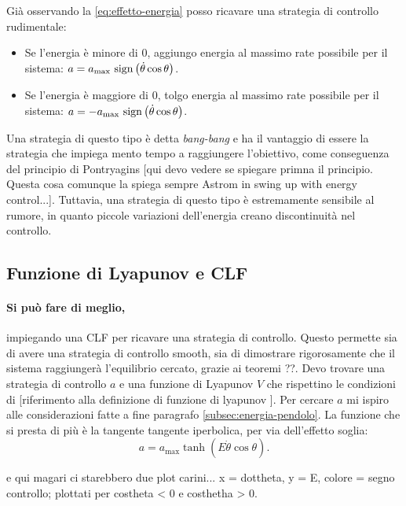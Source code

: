 Già osservando la \eqref{eq:effetto-energia} posso ricavare una strategia di controllo rudimentale:
\begin{itemize}
    \item Se l'energia è minore di $0$, aggiungo energia al massimo rate possibile per il sistema: $a = a_{\max}\ \mathrm{sign}\left(\dot \theta \cos \theta\right)$.
    \item Se l'energia è maggiore di $0$, tolgo energia al massimo rate possibile per il sistema: $a = -a_{\max}\ \mathrm{sign}\left(\dot \theta \cos \theta\right)$.
\end{itemize}
Una strategia di questo tipo è detta \emph{bang-bang} e ha il vantaggio di essere la strategia che impiega mento tempo a raggiungere l'obiettivo, come conseguenza del principio di Pontryagins [qui devo vedere se spiegare primna il principio. Questa cosa comunque la spiega sempre Astrom in swing up with energy control...]. Tuttavia, una strategia di questo tipo è estremamente sensibile al rumore, in quanto piccole variazioni dell'energia creano discontinuità nel controllo.


\subsection{Funzione di Lyapunov e CLF}
\paragraph{Si può fare di meglio,} impiegando una CLF per ricavare una strategia di controllo. Questo permette sia di avere una strategia di controllo smooth, sia di dimostrare rigorosamente che il sistema raggiungerà l'equilibrio cercato, grazie ai teoremi ??. 
Devo trovare una strategia di controllo $a$ e una funzione di Lyapunov $V$ che rispettino le condizioni di [riferimento alla definizione di funzione di lyapunov ].
Per cercare $a$ mi ispiro alle considerazioni fatte a fine paragrafo \ref{subsec:energia-pendolo}. La funzione che si presta di più è la tangente tangente iperbolica, per via dell'effetto soglia:
\begin{equation}
    a = a_{\max} \tanh(E \dot \theta \cos \theta).
    \label{eq:control-strategy-test}
\end{equation}

e qui magari ci starebbero due plot carini...
x = dottheta, y = E, colore = segno controllo; plottati per costheta < 0 e costhetha > 0. %

